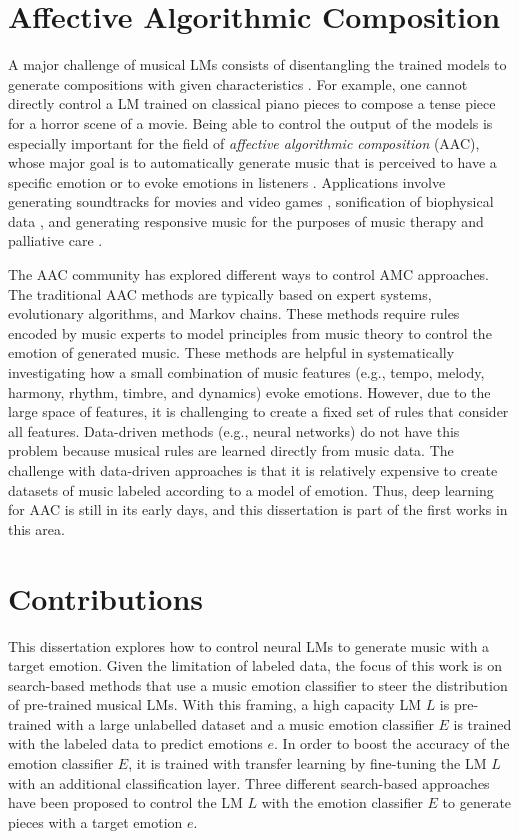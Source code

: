 \section{Affective Algorithmic Composition}

A major challenge of musical LMs consists of disentangling the trained models to generate compositions with given characteristics \cite{ferreira_2019}. For example, one cannot directly control a LM trained on classical piano pieces to compose a tense piece for a horror scene of a movie. Being able to control the output of the models is especially important for the field of \textit{affective algorithmic composition} (AAC), whose major goal is to automatically generate music that is perceived to have a specific emotion or to evoke emotions in listeners \cite{williams2015investigating}. Applications involve generating soundtracks for movies and video games \cite{williams2015dynamic}, sonification of biophysical data \cite{Chen2015}, and generating responsive music for the purposes of music therapy and palliative care \cite{miranda2011brain}.

The AAC community has explored different ways to control AMC approaches. The traditional AAC methods are typically based on expert systems, evolutionary algorithms, and Markov chains. These methods require rules encoded by music experts to model principles from music theory to control the emotion of generated music. These methods are helpful in systematically investigating how a small combination of music features (e.g., tempo, melody, harmony, rhythm, timbre, and dynamics) evoke emotions. However, due to the large space of features, it is challenging to create a fixed set of rules that consider all features. Data-driven methods (e.g., neural networks) do not have this problem because musical rules are learned directly from music data. The challenge with data-driven approaches is that it is relatively expensive to create datasets of music labeled according to a model of emotion. Thus, deep learning for AAC is still in its early days, and this dissertation is part of the first works in this area.

\section{Contributions}

This dissertation explores how to control neural LMs to generate music with a target emotion. Given the limitation of labeled data, the focus of this work is on search-based methods that use a music emotion classifier to steer the distribution of pre-trained musical LMs. With this framing, a high capacity LM $L$ is pre-trained with a large unlabelled dataset and a music emotion classifier $E$ is trained with the labeled data to predict emotions $e$. In order to boost the accuracy of the emotion classifier $E$, it is trained with transfer learning by fine-tuning the LM $L$ with an additional classification layer. Three different search-based approaches have been proposed to control the LM $L$ with the emotion classifier $E$ to generate pieces with a target emotion $e$.

